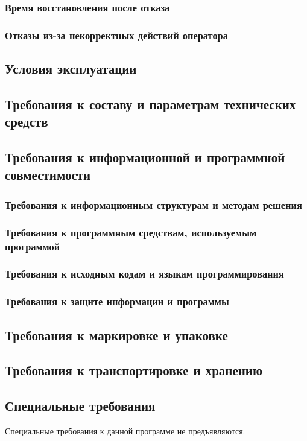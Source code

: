     \subsubsection{Время восстановления после отказа}

    \subsubsection{Отказы из-за некорректных действий оператора}

\subsection{Условия эксплуатации}

\subsection{Требования к составу и параметрам технических средств}

\subsection{Требования к информационной и программной совместимости}
    \subsubsection{Требования к информационным структурам и методам решения}

    \subsubsection{Требования к программным средствам, используемым программой}
    
    \subsubsection{Требования к исходным кодам и языкам программирования}

    \subsubsection{Требования к защите информации и программы}

\subsection{Требования к маркировке и упаковке}

\subsection{Требования к транспортировке и хранению}

\subsection{Специальные требования}
    Специальные требования к данной программе не предъявляются.

\clearpage